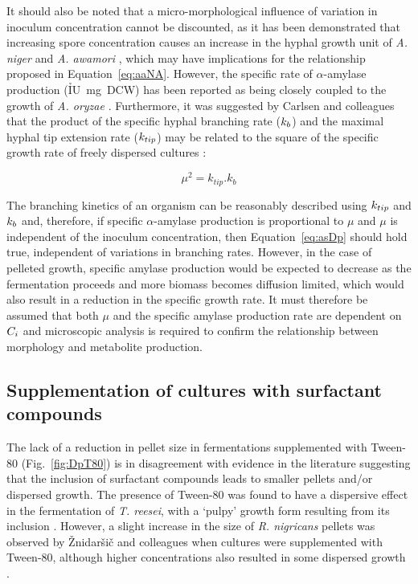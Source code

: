 It should also be noted that a micro-morphological influence of variation in inoculum concentration cannot be discounted, as it has been demonstrated that increasing spore concentration causes an increase in the hyphal growth unit of \emph{A. niger} \cite{papagianni2006b} and \emph{A. awamori} \cite{johansen1998}, which may have implications for the relationship proposed in Equation~\ref{eq:aaNA}. However, the specific rate of $\alpha$-amylase production (\h{IU~mg~DCW}) has been reported as being closely coupled to the growth of \emph{A. oryzae} \cite{carlsen1996b}. Furthermore, it was suggested by Carlsen and colleagues that the product of the specific hyphal branching rate ($k_b$) and the maximal hyphal tip extension rate ($k_{tip}$) may be related to the square of the specific growth rate of freely dispersed cultures \cite{carlsen1996a}:

\begin{equation}
	\mu^2 = k_{tip}.k_{b}
\end{equation}

\noindent The branching kinetics of an organism can be reasonably described using $k_{tip}$ and $k_b$ and, therefore, if specific $\alpha$-amylase production is proportional to $\mu$ and $\mu$ is independent of the inoculum concentration, then Equation~\ref{eq:asDp} should hold true, independent of variations in branching rates. However, in the case of pelleted growth, specific amylase production would be expected to decrease as the fermentation proceeds and more biomass becomes diffusion limited, which would also result in a reduction in the specific growth rate. It must therefore be assumed that both $\mu$ and the specific amylase production rate are dependent on $C_i$ and microscopic analysis is required to confirm the relationship between morphology and metabolite production.

\subsection{Supplementation of cultures with surfactant compounds}

The lack of a reduction in pellet size in fermentations supplemented with Tween-80 (Fig.~\ref{fig:DpT80}) is in disagreement with evidence in the literature suggesting that the inclusion of surfactant compounds leads to smaller pellets and/or dispersed growth. The presence of Tween-80 was found to have a dispersive effect in the fermentation of \emph{T. reesei}, with a \lq pulpy' growth form resulting from its inclusion \cite{domingues2000}. However, a slight increase in the size of \emph{R. nigricans} pellets was observed by \v{Z}nidar\v{s}i\v{c} and colleagues when cultures were supplemented with Tween-80, although higher concentrations also resulted in some dispersed growth \cite{znidarsic2000}.

